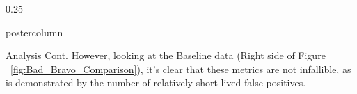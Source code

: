 \documentclass[final,hyperref={pdfpagelabels=false}]{beamer}
\newlength{\columnheight}
\def\colwidth{0.25\linewidth}
\begin{document}
\begin{frame}[fragile]
\begin{columns}[t]
    \begin{column}{\colwidth}
      \begin{beamercolorbox}[center,wd=\textwidth]{postercolumn}
        \begin{minipage}[T]{.98\textwidth} %
          \parbox[t][\columnheight]{\textwidth}{ %


            \begin{block}{Analysis Cont.}
              However, looking at the Baseline data (Right side of Figure ~\ref{fig:Bad_Bravo_Comparison}), it's clear that these metrics are not infallible, as is demonstrated by the number of relatively short-lived false positives.

              \vspace{\baselineskip}


\end{block}}
\end{minipage}
\end{beamercolorbox}
\end{column}
\end{columns}
\end{frame}
\end{document}
